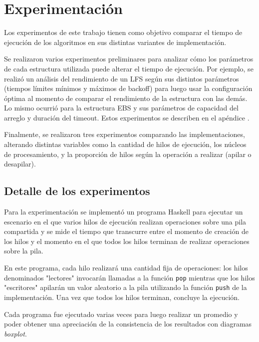 \chapter{Experimentación}\label{chap:experiments}
Los experimentos de este trabajo tienen como objetivo comparar el tiempo de ejecución de los algoritmos en sus distintas variantes de implementación.

Se realizaron varios experimentos preliminares para analizar cómo los parámetros de cada estructura utilizada puede alterar el tiempo de ejecución.
Por ejemplo, se realizó un análisis del rendimiento de un LFS según sus distintos parámetros (tiempos límites mínimos y máximos de backoff) para luego usar la configuración óptima al momento de comparar el rendimiento de la estructura con las demás. Lo mismo ocurrió para la estructura EBS y sus parámetros de capacidad del arreglo y duración del timeout.  Estos experimentos se describen en el apéndice \label{config-experiments}.

Finalmente, se realizaron tres experimentos comparando las implementaciones, alterando distintas variables como la cantidad de hilos de ejecución, los núcleos de procesamiento, y la proporción de hilos según la operación a realizar (apilar o desapilar).

\section{Detalle de los experimentos}\label{sec:experiment-details}

Para la experimentación se implementó un programa Haskell para ejecutar un escenario en el que varios hilos de ejecución realizan operaciones sobre una pila compartida y se mide el tiempo que transcurre entre el momento de creación de los hilos y el momento en el que todos los hilos terminan de realizar operaciones sobre la pila.

En este programa, cada hilo realizará una cantidad fija de operaciones: los hilos denominados "lectores" invocarán llamadas a la función \texttt{pop} mientras que los hilos "escritores" apilarán un valor aleatorio a la pila utilizando la función \texttt{push} de la implementación. Una vez que todos los hilos terminan, concluye la ejecución.

Cada programa fue ejecutado varias veces para luego realizar un promedio y poder obtener una apreciación de la consistencia de los resultados con diagramas \emph{boxplot}.

